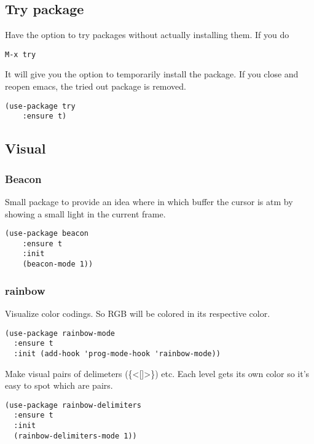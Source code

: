 \documentclass[11pt]{article}
\begin{document}
\subsection{Try package}
\label{sec:org4b79692}
Have the option to try packages without actually installing them. If you do

\begin{verbatim}
M-x try
\end{verbatim}

It will give you the option to temporarily install the package. If you close and reopen emacs, the tried out package is removed.

\begin{verbatim}
(use-package try
    :ensure t)
\end{verbatim}
\subsection{Visual}
\label{sec:org327378b}
\subsubsection{Beacon}
\label{sec:org1ec2929}
Small package to provide an idea where in which buffer the cursor is atm by showing a small light in the current frame.
\begin{verbatim}
(use-package beacon
    :ensure t
    :init
    (beacon-mode 1))
\end{verbatim}
\subsubsection{rainbow}
\label{sec:orgd002653}
Visualize color codings. So RGB will be colored in its respective color.
\begin{verbatim}
(use-package rainbow-mode
  :ensure t
  :init (add-hook 'prog-mode-hook 'rainbow-mode))
\end{verbatim}

Make visual pairs of delimeters (\{<[]>\}) etc. Each level gets its own color so it's easy to spot which are pairs.
\begin{verbatim}
(use-package rainbow-delimiters
  :ensure t
  :init
  (rainbow-delimiters-mode 1))
\end{verbatim}
\end{document}
